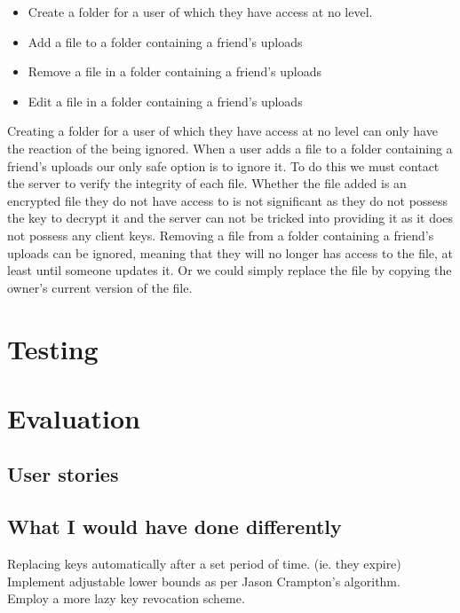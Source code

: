 \documentclass[12pt, titlepage]{article}
\begin{document}
\begin{itemize}
	\item Create a folder for a user of which they have access at no level.
	\item Add a file to a folder containing a friend's uploads
	\item Remove a file in a folder containing a friend's uploads
	\item Edit a file in a folder containing a friend's uploads
\end{itemize}
Creating a folder for a user of which they have access at no level can only have the reaction of the being ignored.
\newline \indent When a user adds a file to a folder containing a friend's uploads our only safe option is to ignore it. To do this we must contact the server to verify the integrity of each file. Whether the file added is an encrypted file they do not have access to is not significant as they do not possess the key to decrypt it and the server can not be tricked into providing it as it does not possess any client keys.
\newline \indent Removing a file from a folder containing a friend's uploads can be ignored, meaning that they will no longer has access to the file, at least until someone updates it. Or we could simply replace the file by copying the owner's current version of the file.

\section{Testing}




\section{Evaluation}

\subsection{User stories}

\subsection{What I would have done differently}
Replacing keys automatically after a set period of time. (ie. they expire)
\\ Implement adjustable lower bounds as per Jason Crampton's algorithm.
\\ Employ a more lazy key revocation scheme.
\end{document}
